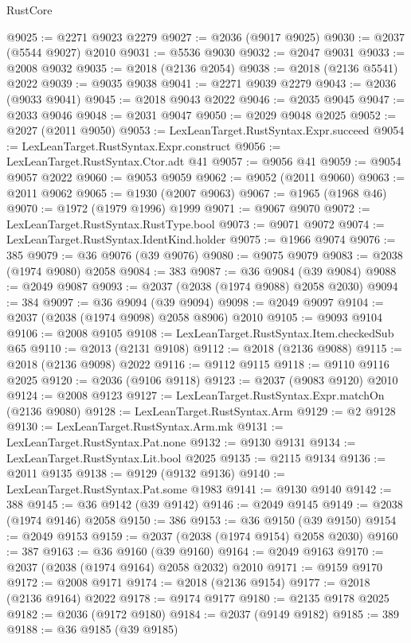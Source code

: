 \begin{lexlean}{RustCore}
\begin{coremodule}
@9025 := @2271 @9023 @2279
@9027 := @2036 (@9017 @9025)
@9030 := @2037 (@5544 @9027) @2010
@9031 := @5536 @9030
@9032 := @2047 @9031
@9033 := @2008 @9032
@9035 := @2018 (@2136 @2054)
@9038 := @2018 (@2136 @5541) @2022
@9039 := @9035 @9038
@9041 := @2271 @9039 @2279
@9043 := @2036 (@9033 @9041)
@9045 := @2018 @9043 @2022
@9046 := @2035 @9045
@9047 := @2033 @9046
@9048 := @2031 @9047
@9050 := @2029 @9048 @2025
@9052 := @2027 (@2011 @9050)
@9053 := LexLeanTarget.RustSyntax.Expr.succeed
@9054 := LexLeanTarget.RustSyntax.Expr.construct
@9056 := LexLeanTarget.RustSyntax.Ctor.adt @41
@9057 := @9056 @41
@9059 := @9054 @9057 @2022
@9060 := @9053 @9059
@9062 := @9052 (@2011 @9060)
@9063 := @2011 @9062
@9065 := @1930 (@2007 @9063)
@9067 := @1965 (@1968 @46)
@9070 := @1972 (@1979 @1996) @1999
@9071 := @9067 @9070
@9072 := LexLeanTarget.RustSyntax.RustType.bool
@9073 := @9071 @9072
@9074 := LexLeanTarget.RustSyntax.IdentKind.holder
@9075 := @1966 @9074
@9076 := 385
@9079 := @36 @9076 (@39 @9076)
@9080 := @9075 @9079
@9083 := @2038 (@1974 @9080) @2058
@9084 := 383
@9087 := @36 @9084 (@39 @9084)
@9088 := @2049 @9087
@9093 := @2037 (@2038 (@1974 @9088) @2058 @2030)
@9094 := 384
@9097 := @36 @9094 (@39 @9094)
@9098 := @2049 @9097
@9104 := @2037 (@2038 (@1974 @9098) @2058 @8906) @2010
@9105 := @9093 @9104
@9106 := @2008 @9105
@9108 := LexLeanTarget.RustSyntax.Item.checkedSub @65
@9110 := @2013 (@2131 @9108)
@9112 := @2018 (@2136 @9088)
@9115 := @2018 (@2136 @9098) @2022
@9116 := @9112 @9115
@9118 := @9110 @9116 @2025
@9120 := @2036 (@9106 @9118)
@9123 := @2037 (@9083 @9120) @2010
@9124 := @2008 @9123
@9127 := LexLeanTarget.RustSyntax.Expr.matchOn (@2136 @9080)
@9128 := LexLeanTarget.RustSyntax.Arm
@9129 := @2 @9128
@9130 := LexLeanTarget.RustSyntax.Arm.mk
@9131 := LexLeanTarget.RustSyntax.Pat.none
@9132 := @9130 @9131
@9134 := LexLeanTarget.RustSyntax.Lit.bool @2025
@9135 := @2115 @9134
@9136 := @2011 @9135
@9138 := @9129 (@9132 @9136)
@9140 := LexLeanTarget.RustSyntax.Pat.some @1983
@9141 := @9130 @9140
@9142 := 388
@9145 := @36 @9142 (@39 @9142)
@9146 := @2049 @9145
@9149 := @2038 (@1974 @9146) @2058
@9150 := 386
@9153 := @36 @9150 (@39 @9150)
@9154 := @2049 @9153
@9159 := @2037 (@2038 (@1974 @9154) @2058 @2030)
@9160 := 387
@9163 := @36 @9160 (@39 @9160)
@9164 := @2049 @9163
@9170 := @2037 (@2038 (@1974 @9164) @2058 @2032) @2010
@9171 := @9159 @9170
@9172 := @2008 @9171
@9174 := @2018 (@2136 @9154)
@9177 := @2018 (@2136 @9164) @2022
@9178 := @9174 @9177
@9180 := @2135 @9178 @2025
@9182 := @2036 (@9172 @9180)
@9184 := @2037 (@9149 @9182)
@9185 := 389
@9188 := @36 @9185 (@39 @9185)

\end{coremodule}
\end{lexlean}
